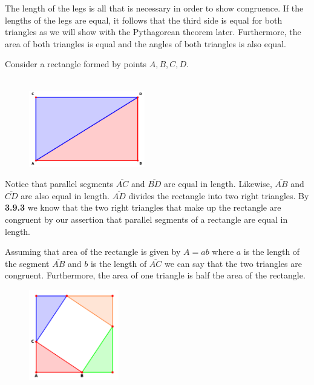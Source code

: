 \documentclass[12pt]{report}
\begin{document}
The length of the legs is all that is necessary in order to show congruence. If the lengths of the legs are equal, it follows that the third side is equal for both triangles as we will show with the Pythagorean theorem later. Furthermore, the area of both triangles is equal and the angles of both triangles is also equal.\medskip


Consider a rectangle formed by points $A,B,C,D$.
\bigskip\\
\bigskip\\
\begin{figure}[h]
    \centering
    \includegraphics[width=0.45\textwidth]{rect.pdf}
\end{figure}


Notice that parallel segments $\overline{AC}$ and $\overline{BD}$ are equal in length. Likewise, $\overline{AB}$ and $\overline{CD}$ are also equal in length. $\overline{AD}$ divides the rectangle into two right triangles. By \textbf{3.9.3} we know that the two right triangles that make up the rectangle are congruent by our assertion that parallel segments of a rectangle are equal in length.



Assuming that area of the rectangle is given by $A=ab$ where $a$ is the length of the segment $\overline{AB}$ and $b$ is the length of $\overline{AC}$ we can say that the two triangles are congruent. Furthermore, the area of one triangle is half the area of the rectangle.


\begin{figure}[h]
    \centering
    \includegraphics[width=0.35\textwidth]{pythagorean.pdf}
\end{figure}
\end{document}
